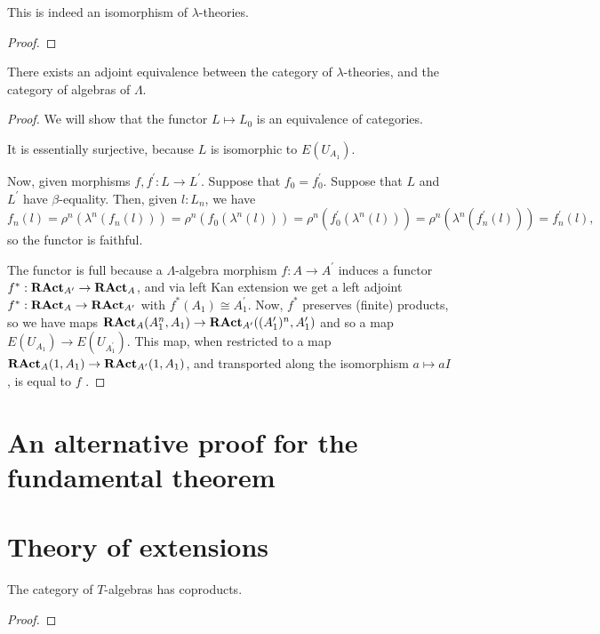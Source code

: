 \begin{lemma}
  This is indeed an isomorphism of $ \lambda $-theories.
\end{lemma}
\begin{proof}
  \TODO
\end{proof}

\begin{theorem}
  There exists an adjoint equivalence between the category of $ \lambda $-theories, and the category of algebras of $ \Lambda $.
\end{theorem}
\begin{proof}
  We will show that the functor $ L \mapsto L_0 $ is an equivalence of categories.

  It is essentially surjective, because $ L $ is isomorphic \TODO to $ E(U_{A_1}) $.

  Now, given morphisms $ f, f^\prime: L \to L^\prime $. Suppose that $ f_0 = f^\prime_0 $. Suppose that $ L $ and $ L^\prime $ have $ \beta $-equality. Then, given $ l: L_n $, we have
  \[ f_n(l) = \rho^n(\lambda^n(f_n(l))) = \rho^n(f_0(\lambda^n(l))) = \rho^n(f^\prime_0(\lambda^n(l))) = \rho^n(\lambda^n(f^\prime_n(l))) = f^\prime_n(l), \]
  so the functor is faithful.

  The functor is full because a $ \Lambda $-algebra morphism $ f: A \to A^\prime $ induces a functor $ f^*: \mathbf{RAct}_{A^\prime} \to \mathbf{RAct}_{A} $, and via left Kan extension we get a left adjoint $ f^*: \mathbf{RAct}_{A} \to \mathbf{RAct}_{A^\prime} $ with $ f^*(A_1) \cong A^\prime_1 $. Now, $ f^* $ preserves (finite) products, so we have maps $ \mathbf{RAct}_{A}(A_1^n, A_1) \to \mathbf{RAct}_{A^\prime}((A^\prime_1)^n, A^\prime_1) $ and so a map $ E(U_{A_1}) \to E(U_{A^\prime_1}) $. This map, when restricted to a map $ \mathbf{RAct}_{A}(1, A_1) \to \mathbf{RAct}_{A^\prime}(1, A_1) $, and transported along the isomorphism $ a \mapsto a I $ \TODO, is equal to $ f $ \TODO.
\end{proof}


\section{An alternative proof for the fundamental theorem}


\section{Theory of extensions}

\begin{lemma}
  The category of $ T $-algebras has coproducts.
\end{lemma}
\begin{proof}
  \TODO
\end{proof}

